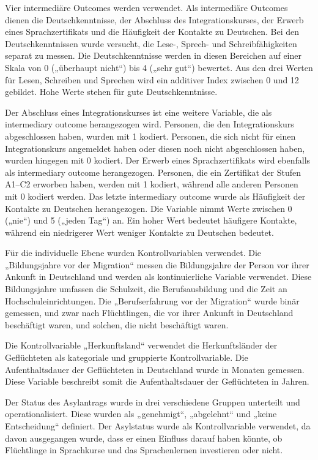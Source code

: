 Vier intermediäre Outcomes werden verwendet. Als intermediäre Outcomes dienen die Deutschkenntnisse, der Abschluss des Integrationskurses, der Erwerb eines Sprachzertifikats und die Häufigkeit der Kontakte zu Deutschen. Bei den Deutschkenntnissen wurde versucht, die Lese-, Sprech- und Schreibfähigkeiten separat zu messen. Die Deutschkenntnisse werden in diesen Bereichen auf einer Skala von 0 („überhaupt nicht“) bis 4 („sehr gut“) bewertet. Aus den drei Werten für Lesen, Schreiben und Sprechen wird ein additiver Index zwischen 0 und 12 gebildet. Hohe Werte stehen für gute Deutschkenntnisse.

Der Abschluss eines Integrationskurses ist eine weitere Variable, die als intermediary outcome herangezogen wird. Personen, die den Integrationskurs abgeschlossen haben, wurden mit 1 kodiert. Personen, die sich nicht für einen Integrationskurs angemeldet haben oder diesen noch nicht abgeschlossen haben, wurden hingegen mit 0 kodiert. Der Erwerb eines Sprachzertifikats wird ebenfalls als intermediary outcome herangezogen. Personen, die ein Zertifikat der Stufen A1–C2 erworben haben, werden mit 1 kodiert, während alle anderen Personen mit 0 kodiert werden. Das letzte intermediary outcome wurde als Häufigkeit der Kontakte zu Deutschen herangezogen. Die Variable nimmt Werte zwischen 0 („nie“) und 5 („jeden Tag“) an. Ein hoher Wert bedeutet häufigere Kontakte, während ein niedrigerer Wert weniger Kontakte zu Deutschen bedeutet.

Für die individuelle Ebene wurden Kontrollvariablen verwendet. Die „Bildungsjahre vor der Migration“ messen die Bildungsjahre der Person vor ihrer Ankunft in Deutschland und werden als kontinuierliche Variable verwendet. Diese Bildungsjahre umfassen die Schulzeit, die Berufsausbildung und die Zeit an Hochschuleinrichtungen. Die „Berufserfahrung vor der Migration“ wurde binär gemessen, und zwar nach Flüchtlingen, die vor ihrer Ankunft in Deutschland beschäftigt waren, und solchen, die nicht beschäftigt waren.

Die Kontrollvariable „Herkunftsland“ verwendet die Herkunftsländer der Geflüchteten als kategoriale und gruppierte Kontrollvariable. Die Aufenthaltsdauer der Geflüchteten in Deutschland wurde in Monaten gemessen. Diese Variable beschreibt somit die Aufenthaltsdauer der Geflüchteten in Jahren.

Der Status des Asylantrags wurde in drei verschiedene Gruppen unterteilt und operationalisiert. Diese wurden als „genehmigt“, „abgelehnt“ und „keine Entscheidung“ definiert. Der Asylstatus wurde als Kontrollvariable verwendet, da davon ausgegangen wurde, dass er einen Einfluss darauf haben könnte, ob Flüchtlinge in Sprachkurse und das Sprachenlernen investieren oder nicht.

